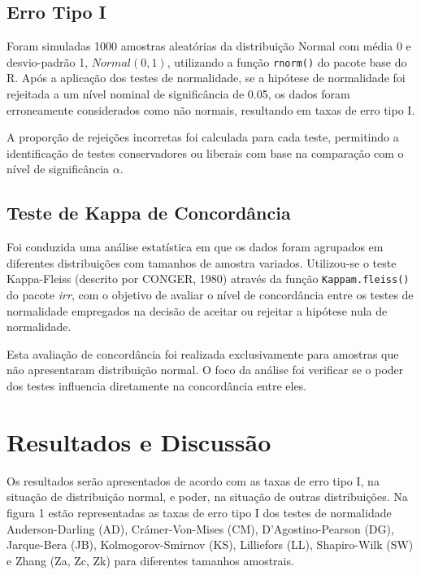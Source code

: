 \documentclass[a4paper,11pt]{article} %
\begin{document}














\subsection{Erro Tipo I}
Foram simuladas 1000 amostras aleatórias da distribuição Normal com média 0 e desvio-padrão 1, $Normal(0, 1)$, utilizando a função \texttt{rnorm()} do pacote base do R. Após a aplicação dos testes de normalidade, se a hipótese de normalidade foi rejeitada a um nível nominal de significância de 0.05, os dados foram erroneamente considerados como não normais, resultando em taxas de erro tipo I. \vskip0.3cm

A proporção de rejeições incorretas foi calculada para cada teste, permitindo a identificação de testes conservadores ou liberais com base na comparação com o nível de significância $\alpha$.

\subsection{Teste de Kappa de Concordância}
Foi conduzida uma análise estatística em que os dados foram agrupados em diferentes distribuições com tamanhos de amostra variados. Utilizou-se o teste Kappa-Fleiss (descrito por CONGER, 1980) através da função \texttt{Kappam.fleiss()} do pacote \textit{irr}, com o objetivo de avaliar o nível de concordância entre os testes de normalidade empregados na decisão de aceitar ou rejeitar a hipótese nula de normalidade. \vskip0.3cm

Esta avaliação de concordância foi realizada exclusivamente para amostras que não apresentaram distribuição normal. O foco da análise foi verificar se o poder dos testes influencia diretamente na concordância entre eles.

\section{Resultados e Discussão}
Os resultados serão apresentados de acordo com as taxas de erro tipo I, na situação de distribuição normal, e poder, na situação de outras distribuições. Na figura 1 estão representadas as taxas de erro tipo I dos testes de normalidade Anderson-Darling (AD), Crámer-Von-Mises (CM), D’Agostino-Pearson (DG), Jarque-Bera (JB), Kolmogorov-Smirnov (KS), Lilliefors (LL), Shapiro-Wilk (SW) e Zhang (Za, Zc, Zk) para diferentes tamanhos amostrais. \vskip0.3cm
\end{document}
